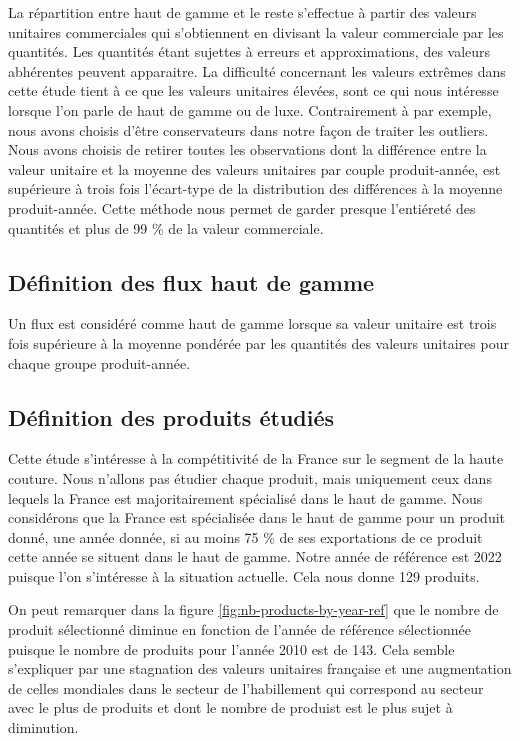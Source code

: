 \documentclass[french,10pt,a4paper]{article}
\begin{document}
La répartition entre haut de gamme et le reste s'effectue à partir des valeurs unitaires commerciales qui s'obtiennent en divisant la valeur commerciale par les quantités. Les quantités étant sujettes à erreurs et approximations, des valeurs abhérentes peuvent apparaitre. La difficulté concernant les valeurs extrêmes dans cette étude tient à ce que les valeurs unitaires élevées, sont ce qui nous intéresse lorsque l'on parle de haut de gamme ou de luxe. Contrairement à \cite{Fontagne2013} par exemple, nous avons choisis d'être conservateurs dans notre façon de traiter les outliers. Nous avons choisis de retirer toutes les observations dont la différence entre la valeur unitaire et la moyenne des valeurs unitaires par couple produit-année, est supérieure à trois fois l'écart-type de la distribution des différences à la moyenne produit-année. Cette méthode nous permet de garder presque l'entiéreté des quantités et plus de 99 \% de la valeur commerciale.


\subsection{Définition des flux haut de gamme}

Un flux est considéré comme haut de gamme lorsque sa valeur unitaire est trois fois supérieure à la moyenne pondérée par les quantités des valeurs unitaires pour chaque groupe produit-année.

\subsection{Définition des produits étudiés}

Cette étude s'intéresse à la compétitivité de la France sur le segment de la haute couture. Nous n'allons pas étudier chaque produit, mais uniquement ceux dans lequels la France est majoritairement spécialisé dans le haut de gamme. Nous considérons que la France est spécialisée dans le haut de gamme pour un produit donné, une année donnée, si au moins 75 \% de ses exportations de ce produit cette année se situent dans le haut de gamme. Notre année de référence est 2022 puisque l'on s'intéresse à la situation actuelle. Cela nous donne 129 produits.

On peut remarquer dans la figure \ref{fig:nb-products-by-year-ref} que le nombre de produit sélectionné diminue en fonction de l'année de référence sélectionnée puisque le nombre de produits pour l'année 2010 est de 143. Cela semble s'expliquer par une stagnation des valeurs unitaires française et une augmentation de celles mondiales dans le secteur de l'habillement qui correspond au secteur avec le plus de produits et dont le nombre de produist est le plus sujet à diminution.
\end{document}

